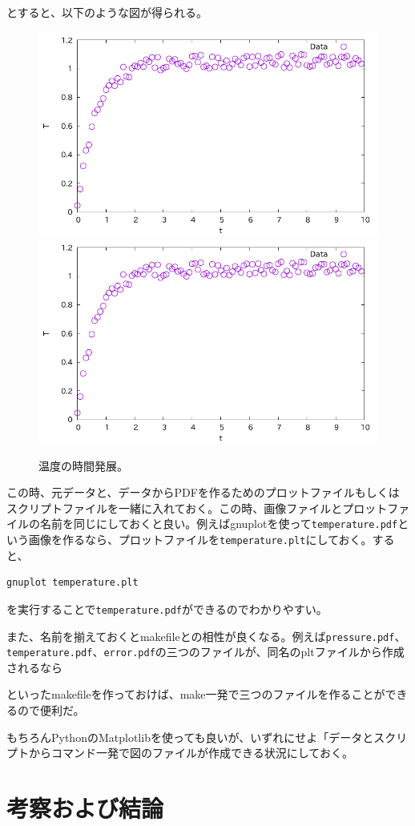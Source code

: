 \documentclass[titlepage]{jsreport}
\begin{document}
とすると、以下のような図が得られる。
\begin{figure}[htbp]
    \centering
    \includegraphics[width=0.49\linewidth]{fig/temperature.pdf}
    \includegraphics[width=0.49\linewidth]{fig/temperature.pdf}
    \caption{温度の時間発展。}
    \label{fig:temperature}
\end{figure}

この時、元データと、データからPDFを作るためのプロットファイルもしくはスクリプトファイルを一緒に入れておく。この時、画像ファイルとプロットファイルの名前を同じにしておくと良い。例えばgnuplotを使って\verb|temperature.pdf|という画像を作るなら、プロットファイルを\verb|temperature.plt|にしておく。すると、

\begin{lstlisting}[language=bash]
gnuplot temperature.plt
\end{lstlisting}

を実行することで\verb|temperature.pdf|ができるのでわかりやすい。

また、名前を揃えておくとmakefileとの相性が良くなる。例えば\verb|pressure.pdf|、\verb|temperature.pdf|、\verb|error.pdf|の三つのファイルが、同名のpltファイルから作成されるなら



といったmakefileを作っておけば、make一発で三つのファイルを作ることができるので便利だ。

もちろんPythonのMatplotlibを使っても良いが、いずれにせよ「データとスクリプトからコマンド一発で図のファイルが作成できる状況にしておく。

\chapter{考察および結論} \label{chap:summary}
\end{document}
